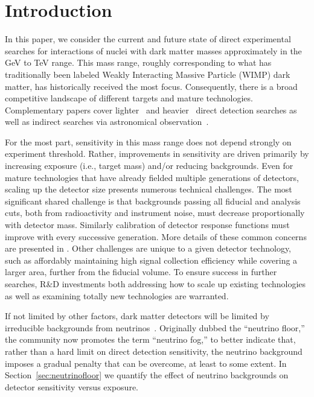 \section{Introduction}
\label{sec:intro}
In this paper, we consider the current and future state of direct experimental searches for interactions of nuclei with dark matter masses approximately in the GeV to TeV range. This mass range, roughly corresponding to what has traditionally been labeled Weakly Interacting Massive Particle (WIMP) dark matter,  has historically received the most focus. Consequently, there is a broad competitive landscape of different targets and mature technologies. 
Complementary papers cover lighter~\cite{SnowmassCF1WP2} and heavier~\cite{SnowmassCF1WP8} direct detection searches as well as indirect searches via astronomical observation~\cite{SnowmassCF1WP5}. 

For the most part, sensitivity in this mass range does not depend strongly on experiment threshold. Rather, improvements in sensitivity are driven primarily by increasing exposure (i.e., target mass) and/or reducing backgrounds. Even for mature technologies that have already fielded multiple generations of detectors, scaling up the detector size presents numerous technical challenges. The most significant shared challenge is that backgrounds passing all fiducial and analysis cuts, both from radioactivity and instrument noise, must decrease proportionally with detector mass. Similarly calibration of detector response functions must improve with every successive generation. More details of these common concerns are presented in \cite{SnowmassCF1WP3}. Other challenges are unique to a given detector technology, such as affordably maintaining high signal collection efficiency while covering a larger area, further from the fiducial volume. To ensure success in further searches, R\&D investments both addressing how to scale up existing technologies as well as examining totally new technologies are warranted. 

If not limited by other factors, dark matter detectors will be limited by irreducible backgrounds from neutrinos~\cite{monroe2007, strigari2009, billard2014b}. Originally dubbed the ``neutrino floor,''  the community now promotes the term ``neutrino fog,'' to better indicate that, rather than a hard limit on direct detection sensitivity, the neutrino background imposes a gradual penalty that can be overcome, at least to some extent. In Section~\ref{sec:neutrinofloor} we quantify the effect of neutrino backgrounds on detector sensitivity versus exposure. 


